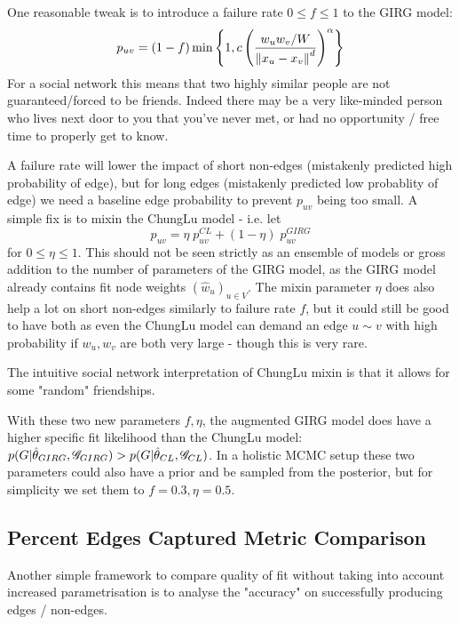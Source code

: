 One reasonable tweak is to introduce a failure rate $0 \leq f \leq 1$ to the GIRG model: 
\begin{equation}
  p_{uv} = (1 - f) \min \left \{ 
    1,
    c \left (
        \frac{w_u w_v / W}{\left\lVert x_u - x_v\right\rVert^d}
    \right )^\alpha    
\right \}
\end{equation}
For a social network this means that two highly similar people are not guaranteed/forced to be friends. Indeed there may be a very like-minded person who lives next door to you that you've never met, or had no opportunity / free time to properly get to know.

A failure rate will lower the impact of short non-edges (mistakenly predicted high probability of edge), but for long edges (mistakenly predicted low probablity of edge) we need a baseline edge probability to prevent $p_{uv}$ being too small. A simple fix is to mixin the ChungLu model - i.e. let 
\begin{equation}
  p_{uv} = \eta \; p_{uv}^{CL} + (1 - \eta) \; p_{uv}^{GIRG}
\end{equation}
for $0 \leq \eta \leq 1$. This should not be seen strictly as an ensemble of models or gross addition to the number of parameters of the GIRG model, as the GIRG model already contains fit node weights $(\hat{w}_u)_{u \in V}$. The mixin parameter $\eta$ does also help a lot on short non-edges similarly to failure rate $f$, but it could still be good to have both as even the ChungLu model can demand an edge $u \sim v$ with high probability if $w_u, w_v$ are both very large - though this is very rare.

The intuitive social network interpretation of ChungLu mixin is that it allows for some "random" friendships.


With these two new parameters $f, \eta$, the augmented GIRG model does have a higher specific fit likelihood than the ChungLu model: $p(G | \hat{\theta}_{GIRG}, \mathscr{G}_{GIRG}) > p(G | \hat{\theta}_{CL}, \mathscr{G}_{CL})$. In a holistic MCMC setup these two parameters could also have a prior and be sampled from the posterior, but for simplicity we set them to $f=0.3, \eta=0.5$.


\subsection{Percent Edges Captured Metric Comparison}
Another simple framework to compare quality of fit without taking into account increased parametrisation is to analyse the "accuracy" on successfully producing edges / non-edges.

